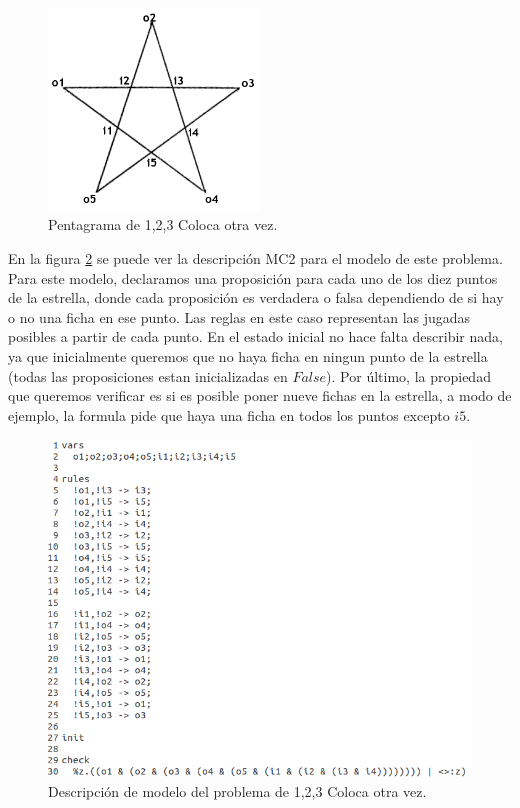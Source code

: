 \begin{figure}[H]
  \centering
  \includegraphics[width=0.5\textwidth]{Figures/pentagram.png}
  \caption{Pentagrama de 1,2,3 Coloca otra vez.}
  \label{fig:pentagrama}
\end{figure}

\noindent En la figura \ref{fig:estrella} se puede ver la descripción MC2 para el modelo de este problema. Para este modelo, declaramos una proposición para cada uno de los diez puntos de la estrella, donde cada proposición es verdadera o falsa dependiendo de si hay o no una ficha en ese punto. Las reglas en este caso representan las jugadas posibles a partir de cada punto. En el estado inicial no hace falta describir nada, ya que inicialmente queremos que no haya ficha en ningun punto de la estrella (todas las proposiciones estan inicializadas en $False$). Por último, la propiedad que queremos verificar es si es posible poner nueve fichas en la estrella, a modo de ejemplo, la formula pide que haya una ficha en todos los puntos excepto $i5$.

\begin{figure}[H]
  \centering
  \includegraphics[width=1\textwidth]{Figures/estrella.png}
  \caption{Descripción de modelo del problema de 1,2,3 Coloca otra vez.}
  \label{fig:estrella}
\end{figure}

